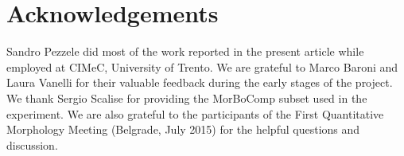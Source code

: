 \documentclass[output=paper]{langsci/langscibook}
\begin{document}
\section*{Acknowledgements}
Sandro Pezzele did most of the work reported in the present article while employed at CIMeC, University of Trento. We are grateful to Marco Baroni and Laura Vanelli for their valuable feedback during the early stages of the project. We thank Sergio Scalise for providing the MorBoComp subset used in the experiment. We are also grateful to the participants of the First Quantitative Morphology Meeting (Belgrade, July 2015) for the helpful questions and discussion.


{\sloppy\printbibliography[heading=subbibliography,notkeyword=this]}
\end{document}
